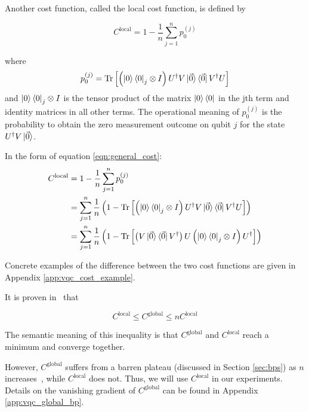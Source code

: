 \documentclass[a4paper,12pt]{article}
\DeclareMathOperator{\tr}{Tr}
\begin{document}
Another cost function, called the local cost function, is defined by 

\begin{equation} \label{eqn:global_vqe_cost}
    C^{\textrm{local}} = 1 - \frac{1}{n} \sum_{j=1}^{n} p_0^{(j)}
\end{equation}

where
\begin{equation} \label{eqn:local_vqc_cost}
    p_0^{(j)} = \tr \left[\left({\ket{0}\bra{0}}_j \otimes I\right) U^\dagger V \ket{\vec{0}}\bra{\vec{0}} V^\dagger U \right]
\end{equation}
and ${\ket{0}\bra{0}}_j \otimes I$ is the tensor product of the matrix $\ket{0}\bra{0}$ in the jth term and identity matrices in all other terms.
The operational meaning of $p_0^{(j)}$ is the probability to obtain the zero measurement outcome on qubit $j$ for the state $U^\dagger V\ket{\vec{0}}$.




In the form of equation \ref{eqn:general_cost}:
\begin{align*}
    C^{\textrm{local}} &= 1 - \frac{1}{n} \sum_{j=1}^{n} p_0^{(j)} \\
    &= \sum_{j=1}^n \frac{1}{n} \left(1 - \tr\left[\left({\ket{0}\bra{0}}_j \otimes I\right) U^\dagger V \ket{\vec{0}}\bra{\vec{0}} V^\dagger U\right] \right) \\
    &= \sum_{j=1}^n \frac{1}{n} \left(1 - \tr\left[ \left(V \ket{\vec{0}}\bra{\vec{0}} V^\dagger\right) U \left({\ket{0}\bra{0}}_j \otimes I\right) U^\dagger\right] \right)
\end{align*}

Concrete examples of the difference between the two cost functions are given in Appendix \ref{app:vqc_cost_example}.

It is proven in~\cite{khatri_quantum-assisted_2019} that

\begin{equation}
    C^{\textrm{local}} \leq C^{\textrm{global}} \leq nC^{\textrm{local}}
\end{equation} 

The semantic meaning of this inequality is that $C^\textrm{global}$ and $C^\textrm{local}$ reach a minimum and converge together.

However, $C^\textrm{global}$ suffers from a barren plateau (discussed in Section \ref{sec:bps}) as $n$ increases~\cite{cerezo_cost_2021}, while $C^\textrm{local}$ does not. Thus, we will use $C^\textrm{local}$ in our experiments.
Details on the vanishing gradient of $C^\textrm{global}$ can be found in Appendix \ref{app:vqc_global_bp}.
\end{document}
